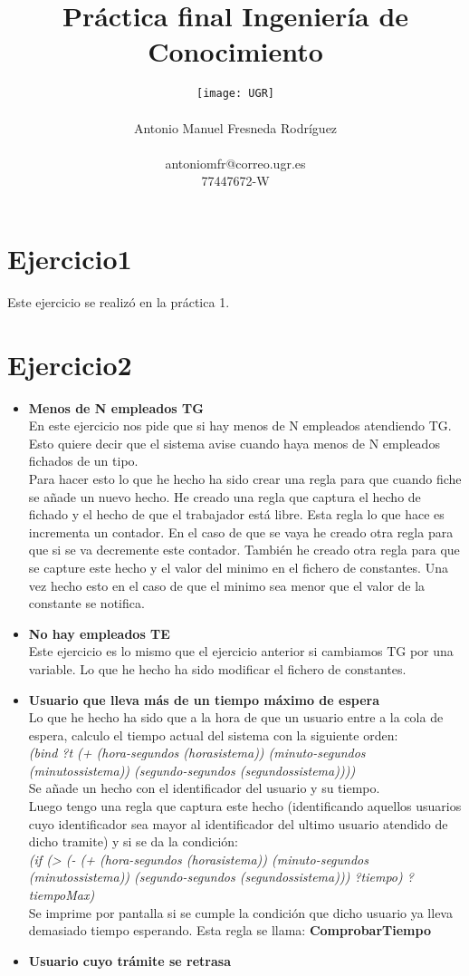 \documentclass[10pt,spanish]{article}
\author{
	\texttt{[image: UGR]} \\\\
	\Large 	Antonio Manuel Fresneda Rodríguez\\
	\\antoniomfr@correo.ugr.es
	\\77447672-W
	}
\date{}
\title{\huge \textbf{Práctica final Ingeniería de Conocimiento}}
\begin{document}
	\maketitle
	\pagebreak
	\tableofcontents
	\pagebreak
	\section{Ejercicio1}
	Este ejercicio se realizó en la práctica 1.
	\section{Ejercicio2}
	\begin{itemize}
		\item \textbf{Menos de N empleados TG}\\
		En este ejercicio nos pide que si hay menos de N empleados atendiendo TG. Esto quiere decir que el sistema avise cuando haya menos de N empleados fichados de un tipo. \\
		Para hacer esto lo que he hecho ha sido crear una regla para que cuando fiche se añade un nuevo hecho. He creado una regla que captura el hecho de fichado y el hecho de que el
		trabajador está libre. Esta regla lo que hace es incrementa un contador. En el caso de que se vaya he creado otra regla para que si se va decremente este contador. También he creado
		otra regla para que se capture este hecho y el valor del minimo en el fichero de constantes. Una vez hecho esto en el caso de que el minimo sea menor que el valor de la constante
		se notifica.
		\item \textbf{No hay empleados TE}\\
		Este ejercicio es lo mismo que el ejercicio anterior si cambiamos TG por una variable. Lo que he hecho ha sido modificar el fichero de constantes.
		\item \textbf{Usuario que lleva más de un tiempo 	máximo de espera}\\ Lo que he hecho ha sido que a la hora de que un usuario entre a la cola de espera, calculo el tiempo actual del sistema con la siguiente orden:\\ \textit{(bind ?t (+ (hora-segundos (horasistema)) (minuto-segundos (minutossistema)) (segundo-segundos (segundossistema))))
		}\\
		Se añade un hecho con el identificador del usuario y su tiempo. \\Luego tengo una regla que captura este hecho  (identificando aquellos usuarios cuyo identificador sea mayor al identificador del ultimo usuario atendido de dicho tramite) y si se da la condición:\\ \textit{(if (> (- (+ (hora-segundos (horasistema)) (minuto-segundos (minutossistema)) (segundo-segundos (segundossistema))) ?tiempo) ?tiempoMax)}\\
		Se imprime por pantalla si se cumple la condición que dicho usuario ya lleva demasiado tiempo esperando. Esta regla se llama: \textbf{ComprobarTiempo}
	\item \textbf{Usuario cuyo trámite se retrasa}\\

	\end{itemize}
\end{document}
